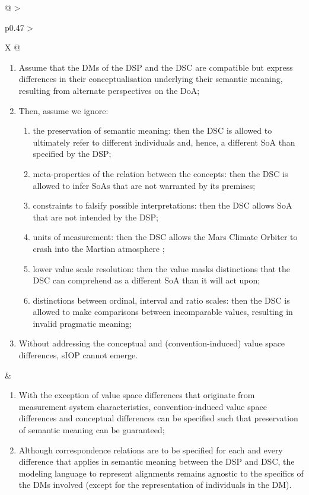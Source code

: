 \begin{xltabular}[l]{\linewidth}{@{} >{\small\raggedright\arraybackslash}p{0.47\linewidth} >{\small\raggedright\arraybackslash}X @{}}
\begin{enumerate}[left=6pt, nosep]
  \item Assume that the DMs of the DSP and the DSC are compatible but express differences in their conceptualisation underlying their semantic meaning, resulting from alternate perspectives on the DoA;
  \item Then, assume we ignore:
  \begin{enumerate}
    \item the preservation of semantic meaning: then the DSC is allowed to ultimately refer to different individuals and, hence, a different SoA than specified by the DSP; 
    \item meta-properties of the relation between the concepts: then the DSC is allowed to infer SoAs that are not warranted by its premises;
    \item constraints to falsify possible interpretations: then the DSC allows SoA that are not intended by the DSP; 
    \item units of measurement: then the DSC allows the Mars Climate Orbiter to crash into the Martian atmosphere \cite{Leveson2004};
    \item lower value scale resolution: then the value masks distinctions that the DSC can comprehend as a different SoA than it will act upon;
    \item distinctions between ordinal, interval and ratio scales: then the DSC is allowed to make comparisons between incomparable values, resulting in invalid pragmatic meaning;
  \end{enumerate}
  \item Without addressing the conceptual and (convention-induced) value space differences, sIOP cannot emerge.
\end{enumerate}
&
\begin{enumerate}[left=10pt, nosep]
  \item With the exception of value space differences that originate from measurement system characteristics, convention-induced value space differences and conceptual differences can be specified such that preservation of semantic meaning can be guaranteed;
  \item Although correspondence relations are to be specified for each and every difference that applies in semantic meaning between the DSP and DSC, the modeling language to represent alignments remains agnostic to the specifics of the DMs involved (except for the representation of individuals in the DM).
\end{enumerate} \\
%
%
%

\end{xltabular}
